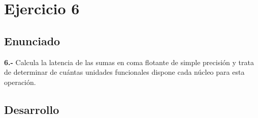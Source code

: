 \section{Ejercicio 6}
\subsection{Enunciado}
\begin{ejer}
    \textbf{6.-} Calcula la latencia de las sumas en coma flotante de simple precisión y trata de determinar de cuántas unidades
    funcionales dispone cada núcleo para esta operación.
\end{ejer}
\subsection{Desarrollo}
